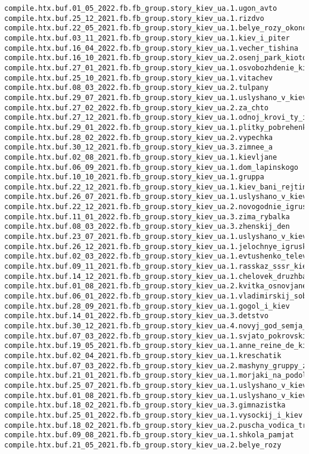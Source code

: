 \begin{Verbatim}
compile.htx.buf.01_05_2022.fb.fb_group.story_kiev_ua.1.ugon_avto
compile.htx.buf.25_12_2021.fb.fb_group.story_kiev_ua.1.rizdvo
compile.htx.buf.22_05_2021.fb.fb_group.story_kiev_ua.1.belye_rozy_okonchanie
compile.htx.buf.03_11_2021.fb.fb_group.story_kiev_ua.1.kiev_i_piter
compile.htx.buf.16_04_2022.fb.fb_group.story_kiev_ua.1.vecher_tishina
compile.htx.buf.16_10_2021.fb.fb_group.story_kiev_ua.2.osenj_park_kioto
compile.htx.buf.27_01_2021.fb.fb_group.story_kiev_ua.1.osvobozhdenie_kieva
compile.htx.buf.25_10_2021.fb.fb_group.story_kiev_ua.1.vitachev
compile.htx.buf.08_03_2022.fb.fb_group.story_kiev_ua.2.tulpany
compile.htx.buf.29_07_2021.fb.fb_group.story_kiev_ua.1.uslyshano_v_kieve_8
compile.htx.buf.27_02_2022.fb.fb_group.story_kiev_ua.2.za_chto
compile.htx.buf.27_12_2021.fb.fb_group.story_kiev_ua.1.odnoj_krovi_ty_i_ja
compile.htx.buf.29_01_2022.fb.fb_group.story_kiev_ua.1.plitky_pobrehenki_60_70_rokiv
compile.htx.buf.28_02_2022.fb.fb_group.story_kiev_ua.2.vypechka
compile.htx.buf.30_12_2021.fb.fb_group.story_kiev_ua.3.zimnee_a
compile.htx.buf.02_08_2021.fb.fb_group.story_kiev_ua.1.kievljane
compile.htx.buf.06_09_2021.fb.fb_group.story_kiev_ua.1.dom_lapinskogo
compile.htx.buf.10_10_2021.fb.fb_group.story_kiev_ua.1.gruppa
compile.htx.buf.22_12_2021.fb.fb_group.story_kiev_ua.1.kiev_bani_rejting
compile.htx.buf.26_07_2021.fb.fb_group.story_kiev_ua.1.uslyshano_v_kieve_7
compile.htx.buf.22_12_2021.fb.fb_group.story_kiev_ua.2.novogodnie_igrushki
compile.htx.buf.11_01_2022.fb.fb_group.story_kiev_ua.3.zima_rybalka
compile.htx.buf.08_03_2022.fb.fb_group.story_kiev_ua.3.zhenskij_den
compile.htx.buf.23_07_2021.fb.fb_group.story_kiev_ua.1.uslyshano_v_kieve_4
compile.htx.buf.26_12_2021.fb.fb_group.story_kiev_ua.1.jelochnye_igruski
compile.htx.buf.02_03_2022.fb.fb_group.story_kiev_ua.1.evtushenko_televyshka
compile.htx.buf.09_11_2021.fb.fb_group.story_kiev_ua.1.rasskaz_sssr_kiev
compile.htx.buf.14_12_2021.fb.fb_group.story_kiev_ua.1.chelovek_druzhba
compile.htx.buf.01_08_2021.fb.fb_group.story_kiev_ua.2.kvitka_osnovjanenko_pismo
compile.htx.buf.06_01_2022.fb.fb_group.story_kiev_ua.1.vladimirskij_sobor
compile.htx.buf.28_09_2021.fb.fb_group.story_kiev_ua.1.gogol_i_kiev
compile.htx.buf.14_01_2022.fb.fb_group.story_kiev_ua.3.detstvo
compile.htx.buf.30_12_2021.fb.fb_group.story_kiev_ua.4.novyj_god_semja_1950
compile.htx.buf.07_03_2022.fb.fb_group.story_kiev_ua.1.svjato_pokrovskij_molitva
compile.htx.buf.19_05_2021.fb.fb_group.story_kiev_ua.1.anne_reine_de_kiev
compile.htx.buf.02_04_2021.fb.fb_group.story_kiev_ua.1.kreschatik
compile.htx.buf.07_03_2022.fb.fb_group.story_kiev_ua.2.mashyny_gruppy_zet
compile.htx.buf.21_01_2021.fb.fb_group.story_kiev_ua.1.morjaki_na_podole
compile.htx.buf.25_07_2021.fb.fb_group.story_kiev_ua.1.uslyshano_v_kieve_6
compile.htx.buf.01_08_2021.fb.fb_group.story_kiev_ua.1.uslyshano_v_kieve_9
compile.htx.buf.18_02_2021.fb.fb_group.story_kiev_ua.3.gimnazistka
compile.htx.buf.25_01_2022.fb.fb_group.story_kiev_ua.1.vysockij_i_kiev
compile.htx.buf.18_02_2021.fb.fb_group.story_kiev_ua.2.puscha_vodica_tramvaj_marshrut
compile.htx.buf.09_08_2021.fb.fb_group.story_kiev_ua.1.shkola_pamjat
compile.htx.buf.21_05_2021.fb.fb_group.story_kiev_ua.2.belye_rozy
\end{Verbatim}
